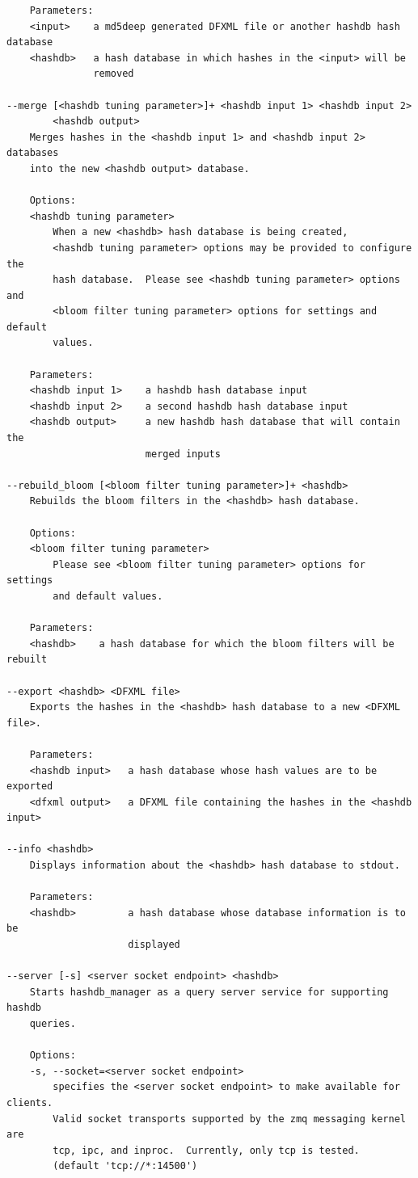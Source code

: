 \documentclass[11pt,twoside]{article}
\begin{document}
\begin{small}
\begin{verbatim}
    Parameters:
    <input>    a md5deep generated DFXML file or another hashdb hash database
    <hashdb>   a hash database in which hashes in the <input> will be
               removed

--merge [<hashdb tuning parameter>]+ <hashdb input 1> <hashdb input 2>
        <hashdb output>
    Merges hashes in the <hashdb input 1> and <hashdb input 2> databases
    into the new <hashdb output> database.

    Options:
    <hashdb tuning parameter>
        When a new <hashdb> hash database is being created,
        <hashdb tuning parameter> options may be provided to configure the
        hash database.  Please see <hashdb tuning parameter> options and
        <bloom filter tuning parameter> options for settings and default
        values.

    Parameters:
    <hashdb input 1>    a hashdb hash database input
    <hashdb input 2>    a second hashdb hash database input
    <hashdb output>     a new hashdb hash database that will contain the
                        merged inputs

--rebuild_bloom [<bloom filter tuning parameter>]+ <hashdb>
    Rebuilds the bloom filters in the <hashdb> hash database.

    Options:
    <bloom filter tuning parameter>
        Please see <bloom filter tuning parameter> options for settings
        and default values.

    Parameters:
    <hashdb>    a hash database for which the bloom filters will be rebuilt

--export <hashdb> <DFXML file>
    Exports the hashes in the <hashdb> hash database to a new <DFXML file>.

    Parameters:
    <hashdb input>   a hash database whose hash values are to be exported
    <dfxml output>   a DFXML file containing the hashes in the <hashdb input>

--info <hashdb>
    Displays information about the <hashdb> hash database to stdout.

    Parameters:
    <hashdb>         a hash database whose database information is to be
                     displayed

--server [-s] <server socket endpoint> <hashdb>
    Starts hashdb_manager as a query server service for supporting hashdb
    queries.

    Options:
    -s, --socket=<server socket endpoint>
        specifies the <server socket endpoint> to make available for clients.
        Valid socket transports supported by the zmq messaging kernel are
        tcp, ipc, and inproc.  Currently, only tcp is tested.
        (default 'tcp://*:14500')


\end{verbatim}
\end{small}
\end{document}
